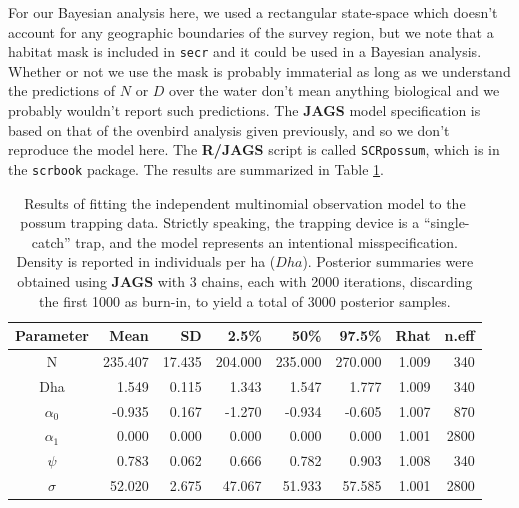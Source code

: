 For our Bayesian analysis here, we used a rectangular state-space which
doesn't account for any geographic boundaries of the survey region, but
we note that a habitat mask is included in {\tt secr} and it could be
used in a Bayesian analysis.
Whether or not we use the mask is
probably immaterial as long as we understand the predictions of $N$ or
$D$ over the water don't mean anything biological and we probably
wouldn't report such predictions. 
 The {\bf JAGS} model
specification is based on that of the ovenbird analysis given
previously, and so we don't reproduce the model here. The {\bf R/JAGS}
script is called \mbox{\tt SCRpossum},  which is in the \mbox{\tt scrbook}
package.
The results are summarized in Table \ref{poisson-mn.tab.possum}.



\begin{table}[ht]
\centering
\caption{Results of fitting the independent multinomial observation
 model to the possum trapping data. Strictly speaking, the trapping
  device is a ``single-catch'' trap, and the model represents an intentional
  misspecification. Density is reported in individuals per ha ($Dha$).
Posterior summaries were obtained using {\bf JAGS} with
 3 chains, each with 2000 iterations, discarding the first 1000 as
 burn-in, to yield a total of 3000 posterior samples.
}
\begin{tabular}{crrrrrrr} \hline \hline
 Parameter & Mean &  SD   & 2.5\% & 50\%  & 97.5\% &Rhat& n.eff \\ \hline
N        & 235.407&  17.435& 204.000& 235.000& 270.000& 1.009&   340\\
Dha      & 1.549  &  0.115&   1.343 &  1.547 &  1.777 &1.009 &  340\\
$\alpha_0$   &-0.935  &  0.167 & -1.270 & -0.934 &  -0.605& 1.007&   870\\
$\alpha_1$   &0.000   & 0.000  & 0.000  & 0.000  &   0.000& 1.001&  2800\\
$\psi$      &0.783   & 0.062  & 0.666  & 0.782  &   0.903& 1.008&   340\\
$\sigma$   &52.020   & 2.675  &47.067  & 51.933 &  57.585& 1.001&  2800
\\ \hline
\end{tabular}
\label{poisson-mn.tab.possum}
\end{table}


